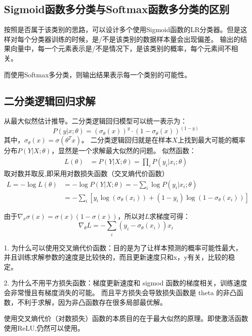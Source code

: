 \subsection{Sigmoid函数多分类与Softmax函数多分类的区别}
按照是否属于该类别的思路，可以设计多个使用Sigmoid函数的LR分类器。但是这样对每个分类器训练的时候，是/不是该类别的数据样本量会出现偏差。
输出的结果向量中，每一个元素表示是/不是情况下，是该类别的概率，每个元素间不相关。

而使用Softmax多分类，则输出结果表示每一个类别的可能性。

\subsection{二分类逻辑回归求解}
从最大似然估计推导。二分类逻辑回归模型可以统一表示为：
\begin{equation*}
    P(y|x;\theta) = (\sigma_\theta(x))^y \cdot (1-\sigma_\theta(x))^{(1-y)}
\end{equation*}
其中，$\sigma_\theta(x) = \sigma(\theta^T x)$。
二分类逻辑回归就是在样本$X$上找到最大可能的概率分布$P(Y|X;\theta)$，显然是一个求解最大似然的问题。
似然函数：
\begin{align*}
    L(\theta) &= P(Y|X;\theta) = \prod_i P(y_i|x_i;\theta) 
\end{align*}
取对数并取反,即采用对数损失函数（交叉熵代价函数）
\begin{align*}
    L = -\log L(\theta) &= -\log P(Y|X;\theta) = -\sum_i \log P(y_i|x_i;\theta) \\ 
    &= - \sum_i \left[ y_i \log (\sigma_\theta(x_i)) + (1-y_i) \log (1-\sigma_\theta(x_i))\right]
\end{align*}

由于$\nabla_x \sigma(x) = \sigma(x)(1-\sigma(x))$，所以对$L$求梯度可得：
\begin{equation*}
    \nabla_\theta L = -\sum_i (y_i - \sigma_\theta(x_i))x_i
\end{equation*}

{}

1. 为什么可以使用交叉熵代价函数：目的是为了让样本预测的概率可能性最大，
并且训练求解参数的速度是比较快的，而且更新速度只和x，y有关，比较的稳定。

2. 为什么不用平方损失函数：梯度更新速度和 sigmod 函数的梯度相关，训练速度会非常慢且有梯度消失的可能。
而且平方损失会导致损失函数是 theta 的非凸函数，不利于求解，因为非凸函数存在很多局部最优解。

使用交叉熵代价（对数损失）函数的本质目的在于最大似然的原理。即使激活函数使用ReLU,仍然可以使用。

